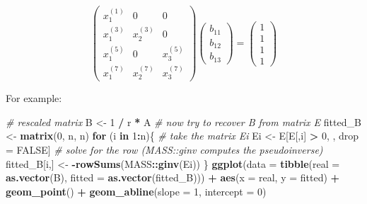 \documentclass[]{book}
\newenvironment{Shaded}{\begin{snugshade}}{\end{snugshade}}
\newcommand{\CommentTok}[1]{\textcolor[rgb]{0.56,0.35,0.01}{\textit{#1}}}
\newcommand{\ControlFlowTok}[1]{\textcolor[rgb]{0.13,0.29,0.53}{\textbf{#1}}}
\newcommand{\DataTypeTok}[1]{\textcolor[rgb]{0.13,0.29,0.53}{#1}}
\newcommand{\DecValTok}[1]{\textcolor[rgb]{0.00,0.00,0.81}{#1}}
\newcommand{\KeywordTok}[1]{\textcolor[rgb]{0.13,0.29,0.53}{\textbf{#1}}}
\newcommand{\NormalTok}[1]{#1}
\newcommand{\OperatorTok}[1]{\textcolor[rgb]{0.81,0.36,0.00}{\textbf{#1}}}
\newcommand{\OtherTok}[1]{\textcolor[rgb]{0.56,0.35,0.01}{#1}}
\newcommand{\StringTok}[1]{\textcolor[rgb]{0.31,0.60,0.02}{#1}}
\begin{document}
\[
\begin{pmatrix}
x_1^{(1)} & 0 & 0 \\
x_1^{(3)} & x_2^{(3)} & 0 \\
x_1^{(5)} & 0 & x_3^{(5)} \\
x_1^{(7)} & x_2^{(7)} & x_3^{(7)} 
\end{pmatrix} 
\begin{pmatrix}
b_{11}\\
b_{12}\\
b_{13}
\end{pmatrix} 
= 
\begin{pmatrix}
1\\
1\\
1\\
1
\end{pmatrix}
\]

For example:

\begin{Shaded}
\begin{Highlighting}[]
\CommentTok{# rescaled matrix}
\NormalTok{B <-}\StringTok{ }\DecValTok{1} \OperatorTok{/}\StringTok{ }\NormalTok{r }\OperatorTok{*}\StringTok{ }\NormalTok{A}
\CommentTok{# now try to recover B from matrix E}
\NormalTok{fitted_B <-}\StringTok{ }\KeywordTok{matrix}\NormalTok{(}\DecValTok{0}\NormalTok{, n, n)}
\ControlFlowTok{for}\NormalTok{ (i }\ControlFlowTok{in} \DecValTok{1}\OperatorTok{:}\NormalTok{n)\{}
  \CommentTok{# take the matrix Ei}
\NormalTok{  Ei <-}\StringTok{ }\NormalTok{E[E[,i] }\OperatorTok{>}\StringTok{ }\DecValTok{0}\NormalTok{, , drop =}\StringTok{ }\OtherTok{FALSE}\NormalTok{]}
  \CommentTok{# solve for the row (MASS::ginv computes the pseudoinverse)}
\NormalTok{  fitted_B[i,] <-}\StringTok{ }\OperatorTok{-}\KeywordTok{rowSums}\NormalTok{(MASS}\OperatorTok{::}\KeywordTok{ginv}\NormalTok{(Ei))}
\NormalTok{\}}
\KeywordTok{ggplot}\NormalTok{(}\DataTypeTok{data =} \KeywordTok{tibble}\NormalTok{(}\DataTypeTok{real =} \KeywordTok{as.vector}\NormalTok{(B),}
                     \DataTypeTok{fitted =} \KeywordTok{as.vector}\NormalTok{(fitted_B))) }\OperatorTok{+}\StringTok{ }
\StringTok{  }\KeywordTok{aes}\NormalTok{(}\DataTypeTok{x =}\NormalTok{ real, }\DataTypeTok{y =}\NormalTok{ fitted) }\OperatorTok{+}\StringTok{ }\KeywordTok{geom_point}\NormalTok{() }\OperatorTok{+}\StringTok{ }
\StringTok{  }\KeywordTok{geom_abline}\NormalTok{(}\DataTypeTok{slope =} \DecValTok{1}\NormalTok{, }\DataTypeTok{intercept =} \DecValTok{0}\NormalTok{)}
\end{Highlighting}
\end{Shaded}
\end{document}
